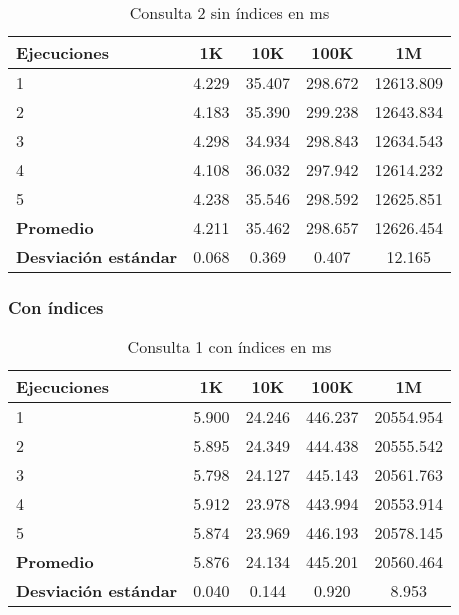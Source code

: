 \documentclass[12pt,a4paper]{article}
\begin{document}
\begin{table}[h!]
\centering
\begin{tabular}{|l|c|c|c|c|}
\hline
\textbf{Ejecuciones} & \textbf{1K} & \textbf{10K} & \textbf{100K} & \textbf{1M} \\
\hline
1 & 4.229 & 35.407 & 298.672 & 12613.809 \\
2 & 4.183 & 35.390 & 299.238 & 12643.834 \\
3 & 4.298 & 34.934 & 298.843 & 12634.543 \\
4 & 4.108 & 36.032 & 297.942 & 12614.232 \\
5 & 4.238 & 35.546 & 298.592 & 12625.851 \\
\hline
\textbf{Promedio} & 4.211 & 35.462 & 298.657 & 12626.454 \\
\textbf{Desviación estándar} & 0.068 & 0.369 & 0.407 & 12.165 \\
\hline
\end{tabular}
\caption{Consulta 2 sin índices en ms}
\label{table:consulta2_sin_indices}
\end{table}

\clearpage
\subsubsection{Con índices}

\begin{table}[h!]
\centering
\begin{tabular}{|l|c|c|c|c|}
\hline
\textbf{Ejecuciones} & \textbf{1K} & \textbf{10K} & \textbf{100K} & \textbf{1M} \\
\hline
1 & 5.900 & 24.246 & 446.237 & 20554.954 \\
2 & 5.895 & 24.349 & 444.438 & 20555.542 \\
3 & 5.798 & 24.127 & 445.143 & 20561.763 \\
4 & 5.912 & 23.978 & 443.994 & 20553.914 \\
5 & 5.874 & 23.969 & 446.193 & 20578.145 \\
\hline
\textbf{Promedio} & 5.876 & 24.134 & 445.201 & 20560.464 \\
\textbf{Desviación estándar} & 0.040 & 0.144 & 0.920 & 8.953 \\
\hline
\end{tabular}
\caption{Consulta 1 con índices en ms}
\label{table:consulta1_con_indices}
\end{table}
\end{document}
